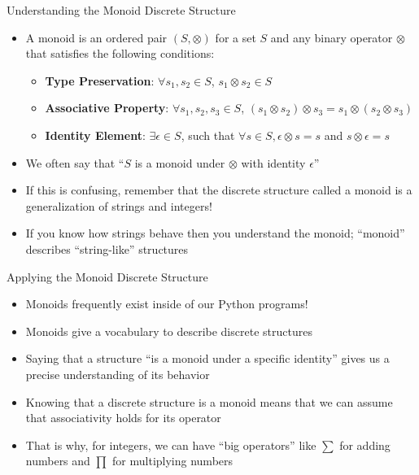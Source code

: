 \documentclass[14pt,aspectratio=169]{beamer}
\begin{document}
%
\begin{frame}{Understanding the Monoid Discrete Structure}
  \begin{itemize}
    \item A monoid is an ordered pair $(S, \otimes)$ for a set $S$ and any
      binary operator $\otimes$ that satisfies the following conditions:
      \begin{itemize}
        \item {\bf Type Preservation}: $\forall s_1, s_2 \in S$, $s_1 \otimes
          s_2 \in S$
        \item {\bf Associative Property}: $\forall s_1, s_2, s_3 \in S$, $(s_1
          \otimes s_2) \otimes s_3 = s_1 \otimes (s_2 \otimes s_3)$
        \item {\bf Identity Element}: $\exists \epsilon \in S$, such that
          $\forall s \in S, \epsilon \otimes s = s$ and $s \otimes \epsilon = s$
      \end{itemize}
      \vspace*{-.2in}
    \item We often say that ``$S$ is a monoid under $\otimes$ with identity
      $\epsilon$''
      \vspace*{-.2in}
    \item If this is confusing, remember that the discrete structure called a
      monoid is a generalization of strings and integers!
      \vspace*{-.2in}
    \item If you know how strings behave then you understand the monoid;
      ``monoid'' describes ``string-like'' structures
  \end{itemize}
\end{frame}

%
\begin{frame}{Applying the Monoid Discrete Structure}
  \begin{itemize}
    \item Monoids frequently exist inside of our Python programs!
      \vspace*{-.2in}
    \item Monoids give a vocabulary to describe discrete structures
      \vspace*{-.2in}
    \item Saying that a structure ``is a monoid under a specific identity''
      gives us a precise understanding of its behavior
      \vspace*{-.2in}
    \item Knowing that a discrete structure is a monoid means that we can assume
      that associativity holds for its operator
      \vspace*{-.2in}
    \item That is why, for integers, we can have ``big operators'' like $\sum$
      for adding numbers and $\prod$ for multiplying numbers
  \end{itemize}
\end{frame}
\end{document}
